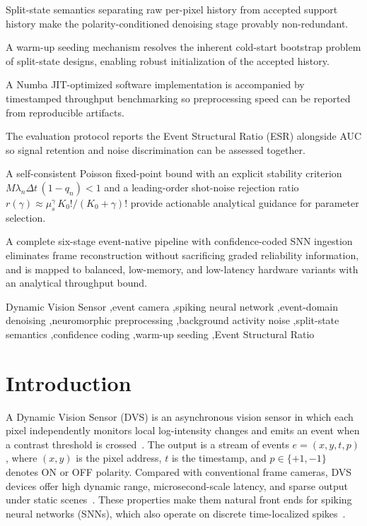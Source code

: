\documentclass[a4paper,fleqn]{cas-dc}
\begin{document}
\begin{highlights}
\item Split-state semantics separating raw per-pixel history from accepted support history make the polarity-conditioned denoising stage provably non-redundant.
\item A warm-up seeding mechanism resolves the inherent cold-start bootstrap problem of split-state designs, enabling robust initialization of the accepted history.
\item A Numba JIT-optimized software implementation is accompanied by timestamped throughput benchmarking so preprocessing speed can be reported from reproducible artifacts.
\item The evaluation protocol reports the Event Structural Ratio (ESR) alongside AUC so signal retention and noise discrimination can be assessed together.
\item A self-consistent Poisson fixed-point bound with an explicit stability criterion $M\lambda_n\Delta t\,(1-q_n)<1$ and a leading-order shot-noise rejection ratio $r(\gamma)\approx \mu_s^{\gamma}\,K_0!/(K_0+\gamma)!$ provide actionable analytical guidance for parameter selection.
\item A complete six-stage event-native pipeline with confidence-coded SNN ingestion eliminates frame reconstruction without sacrificing graded reliability information, and is mapped to balanced, low-memory, and low-latency hardware variants with an analytical throughput bound.
\end{highlights}

\begin{keywords}
Dynamic Vision Sensor \sep event camera \sep spiking neural network \sep event-domain denoising \sep neuromorphic preprocessing \sep background activity noise \sep split-state semantics \sep confidence coding \sep warm-up seeding \sep Event Structural Ratio
\end{keywords}

\maketitle

\section{Introduction}
\label{sec:introduction}

A Dynamic Vision Sensor (DVS) is an asynchronous vision sensor in which each pixel independently monitors local log-intensity changes and emits an event when a contrast threshold is crossed~\citep{lichtsteiner2008128}. The output is a stream of events $e = (x, y, t, p)$, where $(x,y)$ is the pixel address, $t$ is the timestamp, and $p \in \{+1, -1\}$ denotes ON or OFF polarity. Compared with conventional frame cameras, DVS devices offer high dynamic range, microsecond-scale latency, and sparse output under static scenes~\citep{gallego2020survey}. These properties make them natural front ends for spiking neural networks (SNNs), which also operate on discrete time-localized spikes~\citep{eshraghian2023training}.
\end{document}
